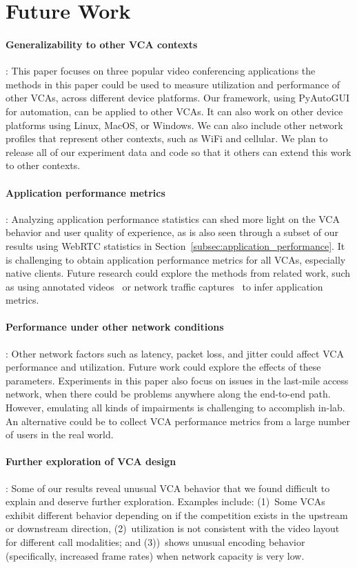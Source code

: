 \section{Future Work}
\label{sec:discussion}

\paragraph{Generalizability to other VCA contexts}: This paper focuses on
three popular video conferencing applications the methods in this paper could
be used to measure utilization and performance of other VCAs, across different
device platforms. Our framework, using PyAutoGUI for automation, can be
applied to other VCAs. It can also work on other device platforms using Linux,
MacOS, or Windows. We can also include other network profiles that represent
other contexts, such as WiFi and cellular. We plan to release all of our
experiment data and code so that it others can extend this work 
to other contexts.


\paragraph{Application performance metrics}: Analyzing application performance
statistics can shed more light on the VCA behavior and user quality of
experience, as is also seen through a subset of our results using WebRTC
statistics in Section~\ref{subsec:application_performance}. It is challenging
to obtain application performance metrics for all VCAs, especially native
clients. Future research could explore the methods from related work, such as
using annotated videos~\cite{xu2012video} or network traffic
captures~\cite{dasari2018scalable} to infer application metrics.

\paragraph{Performance under other network conditions}: Other network factors
such as latency, packet loss, and jitter could affect VCA performance and
utilization.  Future work could explore the effects of these parameters.
Experiments in this paper also focus on issues in the last-mile access
network, when there could be problems anywhere along the end-to-end path.
However, emulating all kinds of impairments is challenging to accomplish
in-lab. An alternative could be to collect VCA performance metrics from a
large number of users in the real world. 

\paragraph{Further exploration of VCA design}: Some of our results reveal
unusual VCA behavior that we found difficult to explain and deserve further
exploration. Examples include: (1)~Some VCAs exhibit different behavior
depending on if the competition exists in the upstream or downstream
direction, (2)~\teams utilization is not consistent with the video layout for
different call modalities; and (3))~\meet shows unusual encoding behavior
(specifically, increased frame rates) when network capacity is very low.

